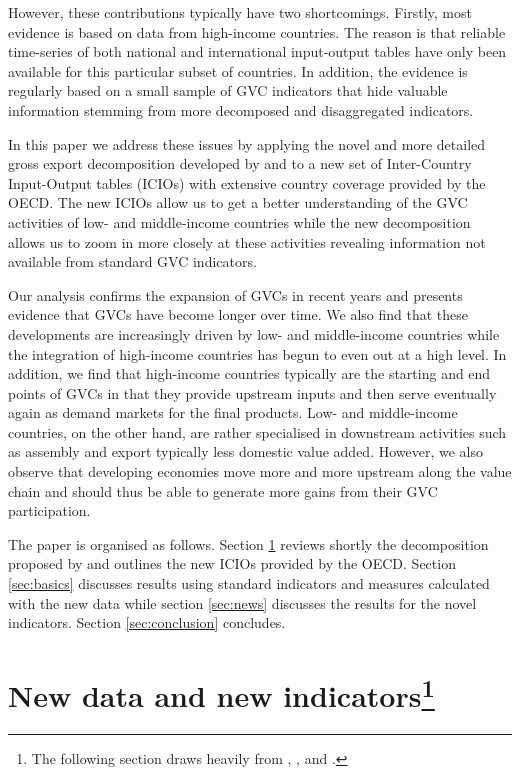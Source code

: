\documentclass[11pt,a4paper]{article}
\begin{document}
However, these contributions typically have two shortcomings. Firstly, most evidence is based on data from high-income countries. The reason is that reliable time-series of both national and international input-output tables have only been available for this particular subset of countries. In addition, the evidence is regularly based on a small sample of GVC indicators that hide valuable information stemming from more decomposed and disaggregated indicators. 

In this paper we address these issues by applying the novel and more detailed gross export decomposition developed by \citet{zhwaetal13} and \citet{rokoetal14} to a new set of Inter-Country Input-Output tables (ICIOs) with extensive country coverage provided by the OECD. The new ICIOs allow us to get a better understanding of the GVC activities of low- and middle-income countries while the new decomposition allows us to zoom in more closely at these activities revealing information not available from standard GVC indicators.

Our analysis confirms the expansion of GVCs in recent years and presents evidence that GVCs have become longer over time. We also find that these developments are increasingly driven by low- and middle-income countries while the integration of high-income countries has begun to even out at a high level. In addition, we find that high-income countries typically are the starting and end points of GVCs in that they provide upstream inputs and then serve eventually again as demand markets for the final products. Low- and middle-income countries, on the other hand, are rather specialised in downstream activities such as assembly and export typically less domestic value added. However, we also observe that developing economies move more and more upstream along the value chain and should thus be able to generate more gains from their GVC participation.

The paper is organised as follows. Section \ref{sec:data} reviews shortly the decomposition proposed by \citet[WWZ henceforth]{zhwaetal13} and outlines the new ICIOs provided by the OECD. Section \ref{sec:basics} discusses results using standard indicators and measures calculated with the new data while section \ref{sec:news} discusses the results for the novel indicators. Section \ref{sec:conclusion} concludes.



\section[New data and new indicators]{New data and new indicators\footnote{The following section draws heavily from \citet{zhwaetal13}, \citet{viku16}, and \cite{baquviku15}.}}\label{sec:data}
\end{document}

